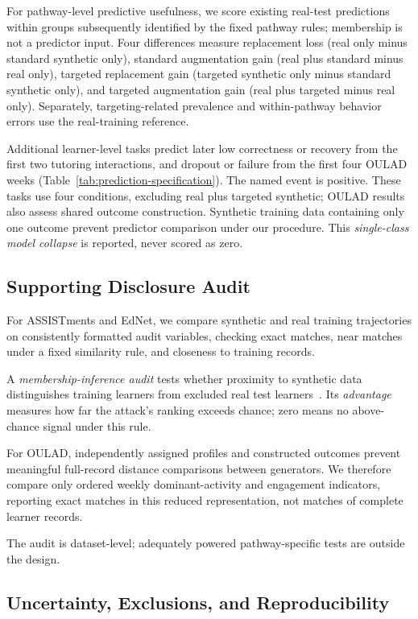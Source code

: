 \documentclass[fleqn,10pt]{JLA_article}
\begin{document}
For pathway-level predictive usefulness, we score existing real-test predictions within groups subsequently identified by the fixed pathway rules; membership is not a predictor input. Four differences measure replacement loss (real only minus standard synthetic only), standard augmentation gain (real plus standard minus real only), targeted replacement gain (targeted synthetic only minus standard synthetic only), and targeted augmentation gain (real plus targeted minus real only). Separately, targeting-related prevalence and within-pathway behavior errors use the real-training reference.

Additional learner-level tasks predict later low correctness or recovery from the first two tutoring interactions, and dropout or failure from the first four OULAD weeks (Table~\ref{tab:prediction-specification}). The named event is positive. These tasks use four conditions, excluding real plus targeted synthetic; OULAD results also assess shared outcome construction. Synthetic training data containing only one outcome prevent predictor comparison under our procedure. This \emph{single-class model collapse} is reported, never scored as zero.

\subsection{Supporting Disclosure Audit}

For ASSISTments and EdNet, we compare synthetic and real training trajectories on consistently formatted audit variables, checking exact matches, near matches under a fixed similarity rule, and closeness to training records.

A \emph{membership-inference audit} tests whether proximity to synthetic data distinguishes training learners from excluded real test learners~\cite{shokri2017membership,stadler2022synthetic}. Its \emph{advantage} measures how far the attack's ranking exceeds chance; zero means no above-chance signal under this rule.

For OULAD, independently assigned profiles and constructed outcomes prevent meaningful full-record distance comparisons between generators. We therefore compare only ordered weekly dominant-activity and engagement indicators, reporting exact matches in this reduced representation, not matches of complete learner records.

The audit is dataset-level; adequately powered pathway-specific tests are outside the design.

\subsection{Uncertainty, Exclusions, and Reproducibility}
\label{sec:uncertainty}
\end{document}
